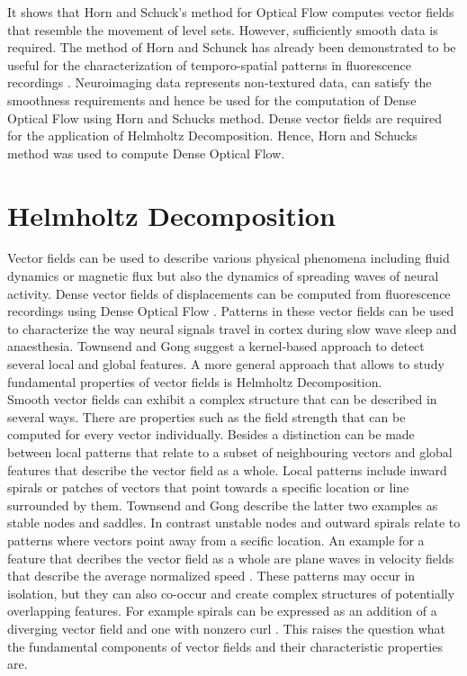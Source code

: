 It shows that Horn and Schuck’s method for Optical Flow computes vector fields that resemble the movement of level sets. However, sufficiently smooth data is required. The method of Horn and Schunck \parencite*{ horn1981determining} has already been demonstrated to be useful for the characterization of temporo-spatial patterns in fluorescence recordings \parencite{townsend2018detection}. Neuroimaging data represents non-textured data, can satisfy the smoothness requirements and hence be used for the computation of Dense Optical Flow using Horn and Schucks method. Dense vector fields are required for the application of Helmholtz Decomposition. Hence, Horn and Schucks method was used to compute Dense Optical Flow.
\section{Helmholtz Decomposition}
\label{section_helmholtz_decomposition}
Vector fields can be used to describe various physical phenomena including fluid dynamics or magnetic flux but also the dynamics of spreading waves of neural activity. Dense vector fields of displacements can be computed from fluorescence recordings using Dense Optical Flow \parencite{townsend2018detection}. Patterns in these vector fields can be used to characterize the way neural signals travel in cortex during slow wave sleep and anaesthesia. Townsend and Gong \parencite*{townsend2018detection} suggest a kernel-based approach to detect several local and global features. A more general approach that allows to study fundamental properties of vector fields is Helmholtz Decomposition. \\
Smooth vector fields can exhibit a complex structure that can be described in several ways. There are properties such as the field strength that can be computed for every vector individually. Besides a distinction can be made between local patterns that relate to a subset of neighbouring vectors and global features that describe the vector field as a whole. Local patterns include inward spirals or patches of vectors that point towards a specific location or line surrounded by them. Townsend and Gong \parencite*{townsend2018detection} describe the latter two examples as stable nodes and saddles. In contrast unstable nodes and outward spirals relate to patterns where vectors point away from a secific location. An example for a feature that decribes the vector field as a whole are plane waves in velocity fields that describe the average normalized speed \parencite{townsend2018detection}. These patterns may occur in isolation, but they can also co-occur and create complex structures of potentially overlapping features. For example spirals can be expressed as an addition of a diverging vector field and one with nonzero curl \parencite{cedmav2020natural}. This raises the question what the fundamental components of vector fields and their characteristic properties are.\\
